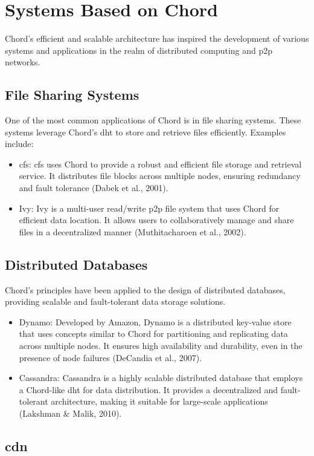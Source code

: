 \chapter{Systems Based on Chord}
Chord's efficient and scalable architecture has inspired the development of various systems and applications in the realm of distributed computing and \gls{p2p} networks.

\section{File Sharing Systems}
One of the most common applications of Chord is in file sharing systems.
These systems leverage Chord's \gls{dht} to store and retrieve files efficiently.
Examples include:
\begin{itemize}
    \item \gls{cfs}: \gls{cfs} uses Chord to provide a robust and efficient file storage and retrieval service.
    It distributes file blocks across multiple nodes, ensuring redundancy and fault tolerance (Dabek et al., 2001).
    \item Ivy: Ivy is a multi-user read/write \gls{p2p} file system that uses Chord for efficient data location.
    It allows users to collaboratively manage and share files in a decentralized manner (Muthitacharoen et al., 2002).
\end{itemize}

\section{Distributed Databases}
Chord's principles have been applied to the design of distributed databases, providing scalable and fault-tolerant data storage solutions.
\begin{itemize}
    \item Dynamo: Developed by Amazon, Dynamo is a distributed key-value store that uses concepts similar to Chord for partitioning and replicating data across multiple nodes.
    It ensures high availability and durability, even in the presence of node failures (DeCandia et al., 2007).
    \item Cassandra: Cassandra is a highly scalable distributed database that employs a Chord-like \gls{dht} for data distribution.
    It provides a decentralized and fault-tolerant architecture, making it suitable for large-scale applications (Lakshman \& Malik, 2010).
\end{itemize}

\section{\acrlong{cdn}}

